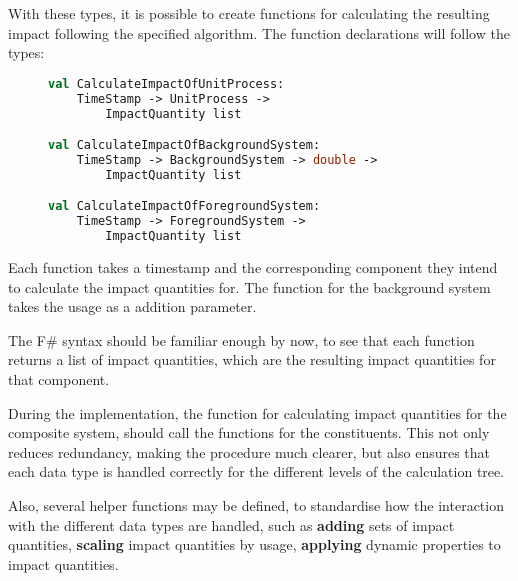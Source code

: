 With these types, it is possible to create functions for calculating the resulting impact following the specified algorithm. The function declarations will follow the types:

\begin{figure}[H]
\begin{lstlisting}[language=FSharp]
val CalculateImpactOfUnitProcess: 
    TimeStamp -> UnitProcess -> 
        ImpactQuantity list

val CalculateImpactOfBackgroundSystem: 
    TimeStamp -> BackgroundSystem -> double -> 
        ImpactQuantity list

val CalculateImpactOfForegroundSystem: 
    TimeStamp -> ForegroundSystem -> 
        ImpactQuantity list
\end{lstlisting}
\end{figure}

Each function takes a timestamp and the corresponding component they intend to calculate the impact quantities for. The function for the background system takes the usage as a addition parameter. 

The F\# syntax should be familiar enough by now, to see that each function returns a list of impact quantities, which are the resulting impact quantities for that component. 

During the implementation, the function for calculating impact quantities for the composite system, should call the functions for the constituents. This not only reduces redundancy, making the procedure much clearer, but also ensures that each data type is handled correctly for the different levels of the calculation tree.

Also, several helper functions may be defined, to standardise how the interaction with the different data types are handled, such as \textbf{adding} sets of impact quantities, \textbf{scaling} impact quantities by usage, \textbf{applying} dynamic properties to impact quantities.

